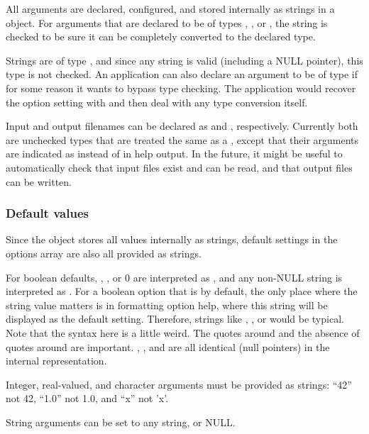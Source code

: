 All arguments are declared, configured, and stored internally as
strings in a  object. For arguments that are
declared to be of types , , or
, the string is checked to be sure it can be
completely converted to the declared type.

Strings are of type , and since any string is
valid (including a NULL pointer), this type is not checked. An
application can also declare an argument to be of type
 if for some reason it wants to bypass type
checking. The application would recover the option setting with
 and then deal with any type
conversion itself.

Input and output filenames can be declared as 
and , respectively. Currently both are unchecked
types that are treated the same as a , except
that their arguments are indicated as  instead of
 in help output. In the future, it might be useful to
automatically check that input files exist and can be read, and that
output files can be written.

   \subsubsection{Default values}

Since the  object stores all values internally as
strings, default settings in the options array are also all provided
as strings.

For boolean defaults, , , or 0 are
interpreted as , and any non-NULL string is interpreted
as .  For a boolean option that is  by
default, the only place where the string value matters is in
formatting option help, where this string will be displayed as the
default setting. Therefore, strings like ,
, or  would be typical. Note that the syntax
here is a little weird. The quotes around  and the
absence of quotes around  are important. ,
, and  are all identical (null pointers) in the
internal representation.

Integer, real-valued, and character arguments must be provided as
strings: ``42'' not 42, ``1.0'' not 1.0, and ``x'' not 'x'. 

String arguments can be set to any string, or NULL. 

